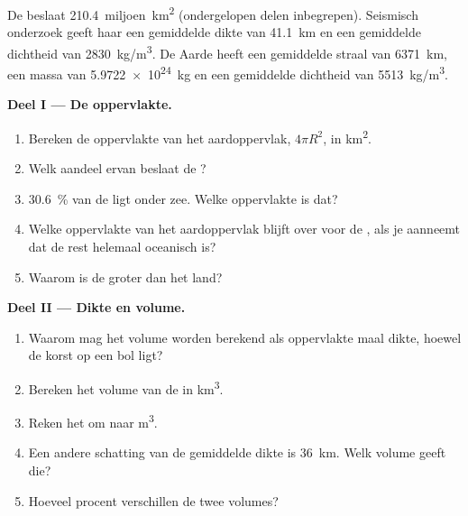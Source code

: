 \begin{problem}
\label{pb:g12:continental-crust:1}
De  beslaat \num{210.4}~miljoen~\unit{km^2} (ondergelopen delen
inbegrepen). Seismisch onderzoek geeft haar een gemiddelde dikte van \qty{41.1}{km} en
een gemiddelde dichtheid van \qty{2830}{kg/m^3}. De Aarde heeft een gemiddelde straal van
\qty{6371}{km}, een massa van \qty{5.9722e24}{kg} en een gemiddelde dichtheid van
\qty{5513}{kg/m^3}.

\medskip
\noindent\textbf{Deel I --- De oppervlakte.}
\begin{enumerate}
  \item Bereken de oppervlakte van het aardoppervlak, $4\pi R^2$, in
        \unit{km^2}.
  \item Welk aandeel ervan beslaat de ?
  \item \qty{30.6}{\percent} van de  ligt onder zee.
        Welke oppervlakte is dat?
  \item Welke oppervlakte van het aardoppervlak blijft over voor de ,
        als je aanneemt dat de rest helemaal oceanisch is?
  \item Waarom is de  groter dan het land?
\end{enumerate}

\medskip
\noindent\textbf{Deel II --- Dikte en volume.}
\begin{enumerate}[resume]
  \item Waarom mag het volume worden berekend als oppervlakte maal dikte, hoewel de
        korst op een bol ligt?
  \item Bereken het volume van de  in \unit{km^3}.
  \item Reken het om naar \unit{m^3}.
  \item Een andere schatting van de gemiddelde dikte is \qty{36}{km}. Welk
        volume geeft die?
  \item Hoeveel procent verschillen de twee volumes?
\end{enumerate}


\end{problem}
